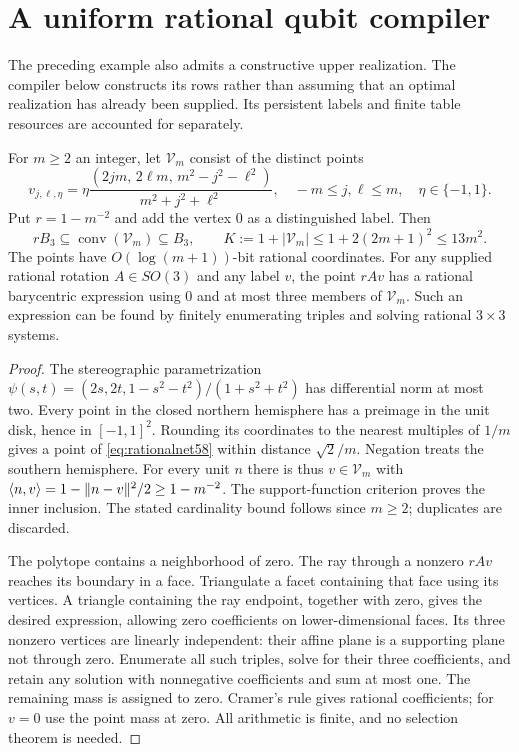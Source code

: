 \section{A uniform rational qubit compiler}\label{sec:rationalcompiler58}
The preceding example also admits a constructive upper realization. The
compiler below constructs its rows rather than assuming that an optimal
realization has already been supplied. Its persistent labels and finite
table resources are accounted for separately.

\begin{lemma}\label{lem:rationalnet58}
For $m\ge2$ an integer, let $\mathcal V_m$ consist of the distinct points
\begin{equation}\label{eq:rationalnet58}
 v_{j,\ell,\eta}
 =\eta\frac{(2jm,\,2\ell m,\,m^2-j^2-\ell^2)}{m^2+j^2+\ell^2},
 \quad -m\le j,\ell\le m,\quad \eta\in\{-1,1\}.
\end{equation}
Put $r=1-m^{-2}$ and add the vertex $0$ as a distinguished label. Then
\[
 rB_3\subseteq\operatorname{conv}(\mathcal V_m)\subseteq B_3,
 \qquad K:=1+|\mathcal V_m|\le1+2(2m+1)^2\le13m^2.
\]
The points have $O(\log(m+1))$-bit rational coordinates. For any supplied
rational rotation $A\in SO(3)$ and any label $v$, the point $rAv$ has a
rational barycentric expression using $0$ and at most three members of
$\mathcal V_m$. Such an expression can be found by finitely enumerating
triples and solving rational $3\times3$ systems.
\end{lemma}
\begin{proof}
The stereographic parametrization
$\psi(s,t)=(2s,2t,1-s^2-t^2)/(1+s^2+t^2)$ has differential norm at
most two. Every point in the closed northern hemisphere has a preimage
in the unit disk, hence in $[-1,1]^2$. Rounding its coordinates to the
nearest multiples of $1/m$ gives a point of \eqref{eq:rationalnet58}
within distance $\sqrt2/m$. Negation treats the southern hemisphere.
For every unit $n$ there is thus $v\in\mathcal V_m$ with
$\langle n,v\rangle=1-\lVert n-v\rVert^2/2\ge1-m^{-2}$.
The support-function criterion proves the inner inclusion. The stated
cardinality bound follows since $m\ge2$; duplicates are discarded.

The polytope contains a neighborhood of zero. The ray through a nonzero
$rAv$ reaches its boundary in a face. Triangulate a facet containing
that face using its vertices. A triangle containing the ray endpoint,
together with zero, gives the desired expression, allowing zero
coefficients on lower-dimensional faces. Its three nonzero vertices
are linearly independent: their affine plane is a supporting plane not
through zero. Enumerate all such triples, solve for their three
coefficients, and retain any solution with nonnegative coefficients and
sum at most one. The remaining mass is assigned to zero. Cramer's rule
gives rational coefficients; for $v=0$ use the point mass at zero.
All arithmetic is finite, and no selection theorem is needed.
\end{proof}

